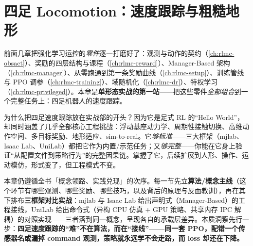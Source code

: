 \chapter{四足 Locomotion：速度跟踪与粗糙地形}\label{ch:rlmc-quadloco}


前面几章把强化学习运控的\emph{零件}逐一打磨好了：观测与动作的契约（\cref{ch:rlmc-obsact}）、奖励的四层结构与课程（\cref{ch:rlmc-reward}）、Manager-Based 架构（\cref{ch:rlmc-manager}）、从零跑通到第一条奖励曲线（\cref{ch:rlmc-setup}）、训练管线与 PPO 调参（\cref{ch:rlmc-training}）、域随机化（\cref{ch:rlmc-dr}）、特权学习（\cref{ch:rlmc-privileged}）。本章是\textbf{单形态实战的第一站}——把这些零件\emph{全部组合}到一个完整任务上：四足机器人的速度跟踪。

为什么把四足速度跟踪放在实战部的开头？因为它是足式 RL 的“Hello World”，却同时涵盖了几乎全部核心工程挑战：浮动基座动力学、周期性接触切换、高维动作空间、多目标奖励、地形适应、sim-to-real。它\emph{够标准}——三大框架（mjlab、Isaac Lab、UniLab）都把它作为内置/示范任务；又\emph{够完整}——你能在它身上验证“从配置文件到策略行为”的完整因果链。掌握了它，后续扩展到人形、操作、运动模仿，形式变了，但工程模式不变。

本章仍遵循全书「概念领路、实践兑现」的次序。每一节先立\textbf{算法/概念主线}（这个环节有哪些观测、哪些奖励、哪些技巧，以及背后的原理与反面教训），再在其下排布\textbf{三框架对比实战}：mjlab 与 Isaac Lab 给出声明式（Manager-Based）的工程接线，UniLab 给出命令式（异构 CPU 仿真 + GPU 策略、共享内存 IPC 解耦）的对照实现——三者落到同一概念，呈现各自的承载层差异。本质洞察先行一步：\textbf{四足速度跟踪的“难”不在算法，而在“接线”——同一套 PPO，配错一个传感器名或漏掉 command 观测，策略就永远学不会走路，而 loss 却还在下降。}

